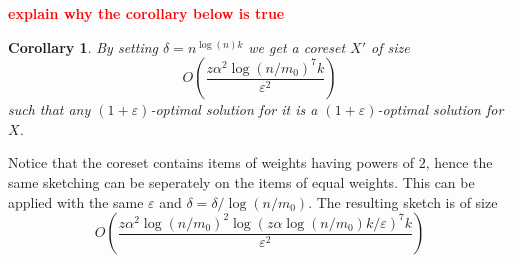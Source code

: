 \documentclass[11pt]{article}
\newtheorem{corollary} {Corollary}
\newcommand{\eps}{\varepsilon}
\newcommand{\note}[1]{\textbf{\textcolor{red}{#1}}}
\newcommand{\cost}{\text{COST}}
\newcommand{\N}{{\cal N}}
\begin{document}
\note{explain why the corollary below is true}
\begin{corollary}
By setting $\delta = n^{\log(n)k}$ we get a coreset $X'$ of size
$$ O\left( \frac{ z \alpha^2 \log(n/m_0)^7 k }{\eps^2} \right)  $$
such that any $(1+\eps)$-optimal solution for it is a $(1+\eps)$-optimal solution for $X$.
\end{corollary}

Notice that the coreset contains items of weights having powers of $2$, hence the same sketching can be seperately on the items of equal weights. This can be applied with the same $\eps$ and $\delta = \delta/\log(n/m_0)$. The resulting sketch is of size
$$ O\left( \frac{ z \alpha^2 \log(n/m_0)^2 \log\left(z \alpha \log(n/m_0) k /\eps \right)^7 k }{\eps^2} \right)  $$

%
\end{document}
